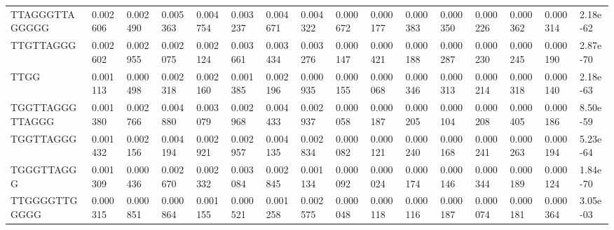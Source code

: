 \begin{samepage}
\begin{table}[h!]
\begin{tabular}{llllllllllllllll}
TTAGGGTTAGGGGG    &  0.002606                                          &  0.002490                            &  0.005363                 &  0.004754        &  0.003237        &  0.004671        &  0.004322        &  0.000672        &  0.000177        &  0.000383        &  0.000350        &  0.000226        &  0.000362        &  0.000314        &  2.18e-62 \\
TTGTTAGGG         &  0.002602                                          &  0.002955                            &  0.002075                 &  0.002124        &  0.003661        &  0.003434        &  0.003276        &  0.000147        &  0.000421        &  0.000188        &  0.000287        &  0.000230        &  0.000245        &  0.000190        &  2.87e-70 \\
TTGG              &  0.001113                                          &  0.000498                            &  0.002318                 &  0.002160        &  0.001385        &  0.002196        &  0.000935        &  0.000155        &  0.000068        &  0.000346        &  0.000313        &  0.000214        &  0.000318        &  0.000140        &  2.18e-63 \\
TGGTTAGGGTTAGGG   &  0.001380                                          &  0.002766                            &  0.004880                 &  0.003079        &  0.002968        &  0.004433        &  0.002937        &  0.000058        &  0.000187        &  0.000205        &  0.000104        &  0.000208        &  0.000405        &  0.000186        &  8.50e-59 \\
TGGTTAGGG         &  0.001432                                          &  0.002156                            &  0.004194                 &  0.002921        &  0.002957        &  0.004135        &  0.002834        &  0.000082        &  0.000121        &  0.000240        &  0.000168        &  0.000241        &  0.000263        &  0.000194        &  5.23e-64 \\
TGGGTTAGGG        &  0.001309                                          &  0.000436                            &  0.002670                 &  0.002332        &  0.003084        &  0.002845        &  0.001134        &  0.000092        &  0.000024        &  0.000174        &  0.000146        &  0.000344        &  0.000189        &  0.000124        &  1.84e-70 \\
TTGGGGTTGGGGG     &  0.000315                                          &  0.000851                            &  0.000864                 &  0.001155        &  0.000521        &  0.001258        &  0.002575        &  0.000048        &  0.000118        &  0.000116        &  0.000187        &  0.000074        &  0.000181        &  0.000364        &  3.05e-03 \\

\end{tabular}
\end{table}
\end{samepage}
